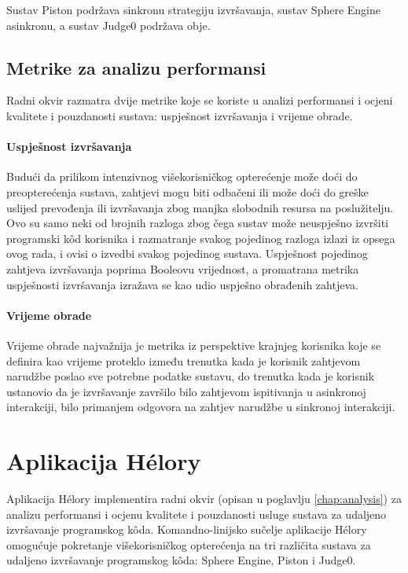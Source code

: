\documentclass[times, utf8, diplomski]{fer}
\begin{document}
Sustav Piston podržava sinkronu strategiju izvršavanja, sustav Sphere Engine asinkronu, a sustav Judge0 podržava obje.

\section{Metrike za analizu performansi}
Radni okvir razmatra dvije metrike koje se koriste u analizi performansi i ocjeni kvalitete i pouzdanosti sustava: uspješnost izvršavanja i vrijeme obrade.

\subsubsection{Uspješnost izvršavanja}
Budući da prilikom intenzivnog višekorisničkog opterećenje može doći do preopterećenja sustava, zahtjevi mogu biti odbačeni ili može doći do greške uslijed prevođenja ili izvršavanja zbog manjka slobodnih resursa na poslužitelju. Ovo su samo neki od brojnih razloga zbog čega sustav može neuspješno izvršiti programski kôd korisnika i razmatranje svakog pojedinog razloga izlazi iz opsega ovog rada, i ovisi o izvedbi svakog pojedinog sustava. Uspješnost pojedinog zahtjeva izvršavanja poprima Booleovu vrijednost, a promatrana metrika uspješnosti izvršavanja izražava se kao udio uspješno obrađenih zahtjeva.

\subsubsection{Vrijeme obrade}
Vrijeme obrade  najvažnija je metrika iz perspektive krajnjeg korisnika koje se definira kao vrijeme proteklo između trenutka kada je korisnik zahtjevom narudžbe poslao sve potrebne podatke sustavu, do trenutka kada je korisnik ustanovio da je izvršavanje završilo bilo zahtjevom ispitivanja u asinkronoj interakciji, bilo primanjem odgovora na zahtjev narudžbe u sinkronoj interakciji.

\chapter{Aplikacija Hélory}
\label{chap:helory}
Aplikacija Hélory implementira radni okvir (opisan u poglavlju \ref{chap:analysis}) za analizu performansi i ocjenu kvalitete i pouzdanosti usluge sustava za udaljeno izvršavanje programskog kôda. Komandno-linijsko sučelje aplikacije Hélory omogućuje pokretanje višekorisničkog opterećenja na tri različita sustava za udaljeno izvršavanje programskog kôda: Sphere Engine, Piston i Judge0.
\end{document}
